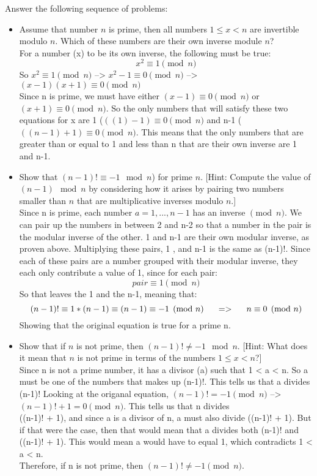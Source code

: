 \documentclass{article}
\begin{document}
 Answer the following sequence of problems:
\begin{itemize}

\item Assume that number $n$ is prime, then all numbers $1 \leq x < n$
  are invertible modulo $n$. Which of these numbers are their own
  inverse module $n$?\\

For a number (x) to be its own inverse, the following must be true:
$$x^{2} \equiv 1 \pmod{n}$$
So $x^{2} \equiv 1 \pmod{n}$ --> $x^{2}-1 \equiv 0 \pmod{n}$
--> $(x-1)(x+1) \equiv 0 \pmod{n}$\\
Since n is prime, we must have either $(x-1) \equiv 0 \pmod{n}$
or $(x+1) \equiv 0 \pmod{n}$. So the only numbers that will satisfy 
these two equations for x are 1 ($((1)-1) \equiv 0 \pmod{n}$ and 
n-1 ($((n-1)+1) \equiv 0 \pmod{n}$. This means that the only numbers
that are greater than or equal to 1 and less than n that are their own
inverse are 1 and n-1.

\item Show that $(n-1)! \equiv -1 \mod n$) for prime $n$. [Hint:
  Compute the value of $(n-1) \mod n$ by considering how it arises by
  pairing two numbers smaller than $n$ that are multiplicative
  inverses modulo $n$.]\\

Since n is prime, each number $a = {1, ... , n-1}$ has an inverse $\pmod{n}$. 
We can pair up the numbers in between 2 and n-2 so that a number in the pair
is the modular inverse of the other. 1 and n-1 are their own modular inverse, as proven above.
Multiplying these pairs, 1 , and n-1 is the same as (n-1)!. Since each of these pairs
are a number grouped with their modular inverse, they each only contribute a value of 1,
since for each pair:
$$pair \equiv 1 \pmod{n}$$
So that leaves the 1 and the n-1, meaning that:
$$(n-1)! \equiv 1 * (n-1) \equiv (n-1) \equiv -1 \pmod{n} \hspace{.2in}=> \hspace{.2in} n \equiv 0 \pmod{n}$$
Showing that the original equation is true for a prime n.


\item Show that if $n$ is not prime, then $(n-1)! \neq -1 \mod
  n$. [Hint: What does it mean that $n$ is not prime in terms of the
    numbers $1 \leq x < n$?]\\

Since n is not a prime number, it has a divisor (a) such that 1 < a < n.
So a must be one of the numbers that makes up (n-1)!. This tells us that
a divides (n-1)! Looking at the origanal equation, $(n-1)! = -1 \pmod{n}$
--> $(n-1)!+1 = 0 \pmod{n}$. This tells us that n divides\\((n-1)! + 1), and since
a is a divisor of n, a must also divide ((n-1)! + 1). But if that were the case, then
that would mean that a divides both (n-1)! and ((n-1)! + 1). This would mean a would 
have to equal 1, which contradicts 1 < a < n.\\Therefore, if n is not prime, then
$(n-1)! \neq -1 \pmod{n}$.


\end{itemize}
\end{document}
